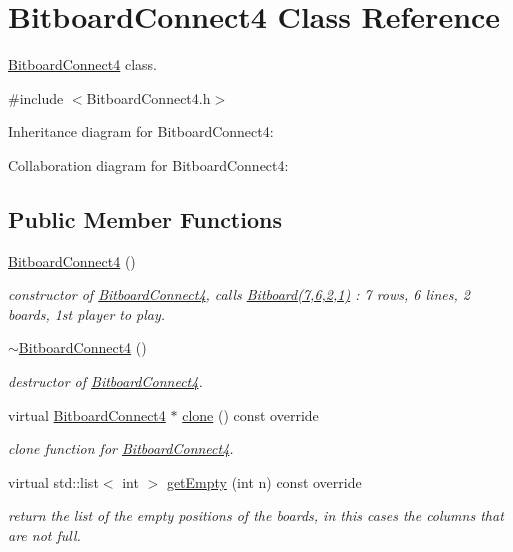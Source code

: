 \hypertarget{class_bitboard_connect4}{\section{Bitboard\+Connect4 Class Reference}
\label{class_bitboard_connect4}
}


\hyperlink{class_bitboard_connect4}{Bitboard\+Connect4} class.  




{\ttfamily \#include $<$Bitboard\+Connect4.\+h$>$}



Inheritance diagram for Bitboard\+Connect4\+:


Collaboration diagram for Bitboard\+Connect4\+:
\subsection*{Public Member Functions}
\begin{DoxyCompactItemize}
\item 
\hypertarget{class_bitboard_connect4_a4ecd252b35ede8cfd2a3d7db5a969f04}{\hyperlink{class_bitboard_connect4_a4ecd252b35ede8cfd2a3d7db5a969f04}{Bitboard\+Connect4} ()}\label{class_bitboard_connect4_a4ecd252b35ede8cfd2a3d7db5a969f04}

\begin{DoxyCompactList}\small\item\em constructor of \hyperlink{class_bitboard_connect4}{Bitboard\+Connect4}, calls \hyperlink{class_bitboard}{Bitboard(7,6,2,1)} \+: 7 rows, 6 lines, 2 boards, 1st player to play. \end{DoxyCompactList}\item 
\hypertarget{class_bitboard_connect4_aa9eab6ae7bde05bc9f2f2f731cea00c5}{\hyperlink{class_bitboard_connect4_aa9eab6ae7bde05bc9f2f2f731cea00c5}{$\sim$\+Bitboard\+Connect4} ()}\label{class_bitboard_connect4_aa9eab6ae7bde05bc9f2f2f731cea00c5}

\begin{DoxyCompactList}\small\item\em destructor of \hyperlink{class_bitboard_connect4}{Bitboard\+Connect4}. \end{DoxyCompactList}\item 
virtual \hyperlink{class_bitboard_connect4}{Bitboard\+Connect4} $\ast$ \hyperlink{class_bitboard_connect4_abfb6d04cc7242da8cdc08e5e2d21542c}{clone} () const override
\begin{DoxyCompactList}\small\item\em clone function for \hyperlink{class_bitboard_connect4}{Bitboard\+Connect4}. \end{DoxyCompactList}\item 
virtual std\+::list$<$ int $>$ \hyperlink{class_bitboard_connect4_acd54582e5aeb4045176dbc506b16ca87}{get\+Empty} (int n) const override
\begin{DoxyCompactList}\small\item\em return the list of the empty positions of the boards, in this cases the columns that are not full. \end{DoxyCompactList}\end{DoxyCompactItemize}
